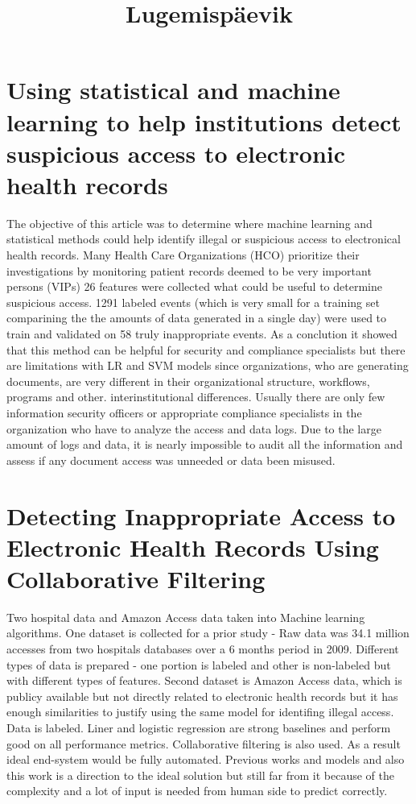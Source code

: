\documentclass[12pt]{article}
\begin{document}
\title{Lugemispäevik}

\section{Using statistical and machine learning to help institutions detect suspicious access to electronic health records}
The objective of this article was to determine where machine learning and statistical methods could help identify illegal or suspicious access to electronical health records. 
Many Health Care Organizations (HCO) prioritize their investigations
by monitoring patient records deemed to be very important persons (VIPs)
26 features were collected what could be useful to determine suspicious access. 1291 labeled events (which is very small for a training set comparining the the amounts of data generated in a single day) were used to train and validated on 58 truly inappropriate events. As a conclution it showed that this method can be helpful for security and compliance specialists but there are limitations with LR and SVM models since organizations, who are generating documents, are very different in their organizational structure, workflows, programs and other.  interinstitutional differences. 
Usually there are only few information security officers or appropriate compliance specialists in the organization who have to analyze the access and data logs. Due to the large amount of logs and data, it is nearly impossible to audit all the information and assess if any document access was unneeded or data been misused.  \cite{10.1136/amiajnl-2011-000217}

\section{Detecting Inappropriate Access to Electronic Health Records Using Collaborative Filtering}
Two hospital data and Amazon Access data taken into Machine learning algorithms. One dataset is collected for a prior study - Raw data was 34.1 million accesses from two hospitals databases over a 6 months period in 2009.  Different types of data is prepared - one portion is labeled and other is non-labeled but with different types of features. 
Second dataset is Amazon Access data, which is publicy available but not directly related to electronic health records but it has enough similarities to justify using the same model for identifing illegal access. Data is labeled. 
Liner and logistic regression are strong baselines and perform good on all performance metrics.
Collaborative filtering is also used. 
As a result ideal end-system would be fully automated. Previous works and models and also this work is a direction to the ideal solution but still far from it because of the complexity and a lot of input is needed from human side to predict correctly. \cite{Menon2014}
\end{document}
